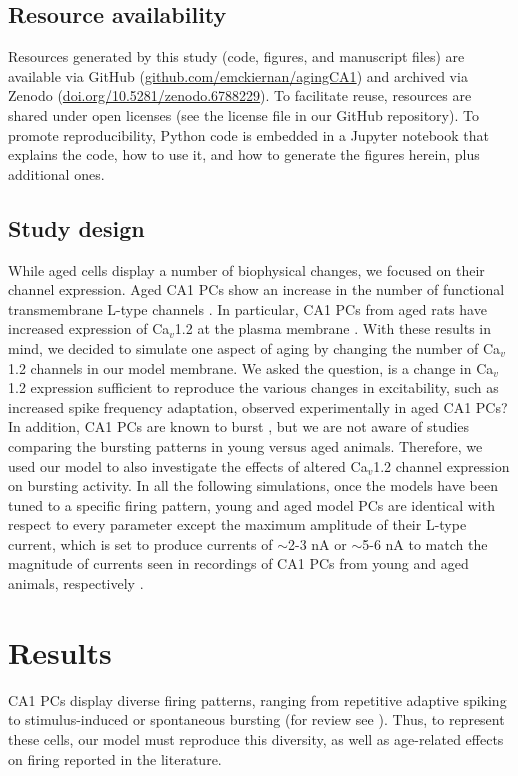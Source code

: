 \documentclass[12pt]{article}
\begin{document}
\subsection{Resource availability}
Resources generated by this study (code, figures, and manuscript files) are available via GitHub (\href{https://github.com/emckiernan/agingCA1}{github.com/emckiernan/agingCA1}) and archived via Zenodo (\href{https://doi.org/10.5281/zenodo.6788229}{doi.org/10.5281/zenodo.6788229}). To facilitate reuse, resources are shared under open licenses (see the license file in our GitHub repository). To promote reproducibility, Python code is embedded in a Jupyter notebook \cite{kluyver2016jupyter} that explains the code, how to use it, and how to generate the figures herein, plus additional ones.

\subsection{Study design}
While aged cells display a number of biophysical changes, we focused on their {\Ca} channel expression. Aged CA1 PCs show an increase in the number of functional transmembrane L-type {\Ca} channels  \citep{herman1998up,thibault1996increase,veng2002regionally}. In particular, CA1 PCs from aged rats have increased expression of Ca$_v$1.2 at the plasma membrane \citep{nunez2014surface}. With these results in mind, we decided to simulate one aspect of aging by changing the number of Ca$_v$1.2 channels in our model membrane. We asked the question, is a change in Ca$_v$1.2 expression sufficient to reproduce the various changes in excitability, such as increased spike frequency adaptation, observed experimentally in aged CA1 PCs? In addition, CA1 PCs are known to burst \citep{mckiernan2017ca1}, but we are not aware of studies comparing the bursting patterns in young versus aged animals. Therefore, we used our model to also investigate the effects of altered Ca$_v$1.2 channel expression on bursting activity. In all the following simulations, once the models have been tuned to a specific firing pattern, young and aged model PCs are identical with respect to every parameter except the maximum amplitude of their L-type {\Ca} current, which is set to produce currents of $\sim$2-3 nA or $\sim$5-6 nA to match the magnitude of currents seen in recordings of CA1 PCs from young and aged animals, respectively \cite{campbell1996aging}. 

\section{Results}
CA1 PCs display diverse firing patterns, ranging from repetitive adaptive spiking to stimulus-induced or spontaneous bursting (for review see \cite{mckiernan2017ca1}). Thus, to represent these cells, our model must reproduce this diversity, as well as age-related effects on firing reported in the literature.  
\end{document}
